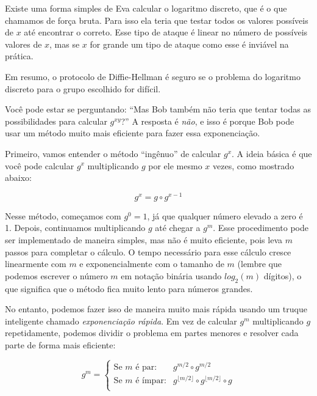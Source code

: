 Existe uma forma simples de Eva calcular o logaritmo discreto, que é o que chamamos de força bruta.
Para isso ela teria que testar todos os valores possíveis de $x$ até encontrar o correto. Esse tipo de ataque é linear no número de possíveis valores de $x$, mas se $x$ for grande um tipo de ataque como esse é inviável na prática.

Em resumo, o protocolo de Diffie-Hellman é seguro se o problema do logaritmo discreto para o grupo escolhido for difícil.


Você pode estar se perguntando:
``Mas Bob também não teria que tentar todas as possibilidades para calcular \( g^{xy} \)?''
A resposta é {\em não}, e isso é porque Bob pode usar um método muito mais eficiente para fazer essa exponenciação.

Primeiro, vamos entender o método ``ingênuo'' de calcular $g^x$.
A ideia básica é que você pode calcular $g^x$ multiplicando $g$ por ele mesmo $x$ vezes, como mostrado abaixo:

\begin{displaymath}
  g^x = g \circ g^{x-1}
\end{displaymath}

Nesse método, começamos com $g^0 = 1$, já que qualquer número elevado a zero é 1.
Depois, continuamos multiplicando $g$ até chegar a $g^m$.
Esse procedimento pode ser implementado de maneira simples, mas não é muito eficiente, pois leva $m$ passos para completar o cálculo.
O tempo necessário para esse cálculo cresce linearmente com $m$ e exponencialmente com o tamanho de $m$ (lembre que podemos escrever o número $m$ em notação binária usando $log_2(m)$ dígitos), o que significa que o método fica muito lento para números grandes.

No entanto, podemos fazer isso de maneira muito mais rápida usando um truque inteligente chamado \textit{exponenciação rápida}.
Em vez de calcular $g^m$ multiplicando $g$ repetidamente, podemos dividir o problema em partes menores e resolver cada parte de forma mais eficiente:

\begin{displaymath}
  g^m = \left\{
    \begin{array}{lcl}
      \text{Se } m \text{ é par:} & g^{m/2} \circ g^{m/2} \\
      \text{Se } m \text{ é ímpar:} & g^{\lfloor m/2 \rfloor} \circ g^{\lfloor m/2 \rfloor} \circ g \\
    \end{array}
  \right.
\end{displaymath}

